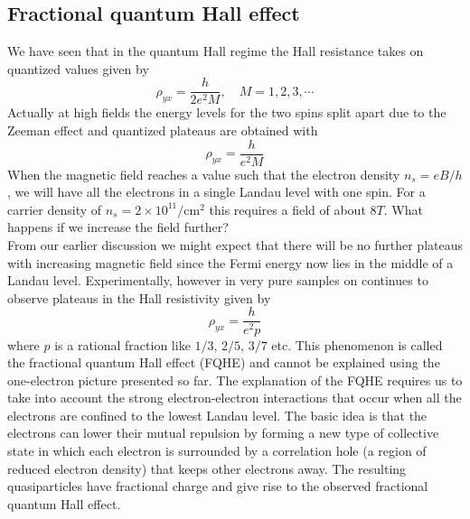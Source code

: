 \documentclass[11pt,a4paper]{book}
\theoremstyle{plain}
\theoremstyle{definition}
\theoremstyle{remark}
\begin{document}
\subsection{Fractional quantum Hall effect}
We have seen that in the quantum Hall regime the Hall resistance takes on quantized values given by
\begin{equation}
    \rho_{yx} = \frac{h}{2 e^2 M}, \quad M = 1,2,3,\cdots
\end{equation}
Actually at high fields the energy levels for the two spins split apart due to the Zeeman effect and quantized plateaus are obtained with
\begin{equation}
    \rho_{yx} = \frac{h}{e^2 M}
\end{equation}
When the magnetic field reaches a value such that the electron density $n_s = eB/h$, we will have all the electrons in a single Landau level with one spin. For a carrier density of $n_s = 2\times 10^{11}/\text{cm}^2$ this requires a field of about 8$T$. What happens if we increase the field further?\\
From our earlier discussion we might expect that there will be no further plateaus with increasing magnetic field since the Fermi energy now lies in the middle of a Landau level. Experimentally, however in very pure samples on continues to observe plateaus in the Hall resistivity given by 
\begin{equation}
    \rho_{yx} = \frac{h}{e^2 p}
\end{equation}
where $p$ is a rational fraction like $1/3$, $2/5$, $3/7$ etc. This phenomenon is called the fractional quantum Hall effect (FQHE) and cannot be explained using the one-electron picture presented so far. The explanation of the FQHE requires us to take into account the strong electron-electron interactions that occur when all the electrons are confined to the lowest Landau level. The basic idea is that the electrons can lower their mutual repulsion by forming a new type of collective state in which each electron is surrounded by a correlation hole (a region of reduced electron density) that keeps other electrons away. The resulting quasiparticles have fractional charge and give rise to the observed fractional quantum Hall effect.
\end{document}
